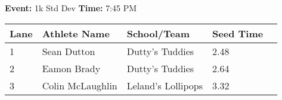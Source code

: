 \documentclass[11pt]{article}
\begin{document}
\textbf{Event:} 1k Std Dev \quad \textbf{Time:} 7:45 PM 

\vspace{1em}
\begin{tabular}{@{}lllll@{}}
\toprule

\textbf{Lane} & \textbf{Athlete Name} & \textbf{School/Team} & \textbf{Seed Time} \\
\midrule
1 & Sean Dutton & Dutty's Tuddies & 2.48 &\\
2 & Eamon Brady & Dutty's Tuddies & 2.64 &\\
3 & Colin McLaughlin & Leland's Lollipops & 3.32 &\\
\bottomrule
\end{tabular}
\vspace{2.5em}
\end{document}
